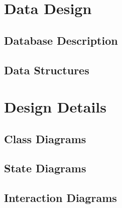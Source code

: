 \documentclass[11pt, a4paper]{report}
\begin{document}
\pagebreak


\chapter{Data Design}%
\label{cha:DD1}


\section{Database Description}


\section{Data Structures}


\pagebreak

\chapter{Design Details}%
\label{cha:DD2}


\section{Class Diagrams}


\section{State Diagrams}


\section{Interaction Diagrams}
\end{document}
